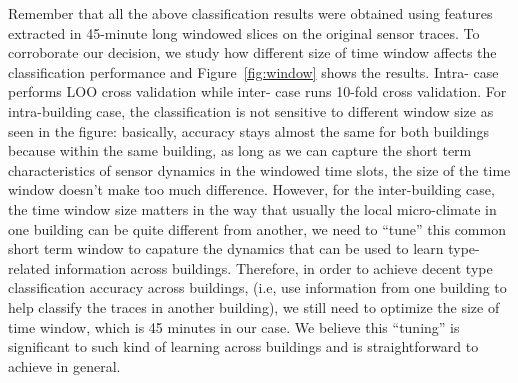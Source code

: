 Remember that all the above classification results were obtained using features extracted in 45-minute long windowed slices on the original sensor traces. To corroborate our decision, 
we study how different size of time window affects the classification performance and Figure~\ref{fig:window} shows the results. Intra- case performs LOO cross validation while inter- 
case runs 10-fold cross validation. For intra-building case, the classification is not sensitive to different window size as seen in the figure: basically, accuracy stays almost the same 
for both buildings because within the same building, as long as we can capture the short term characteristics of sensor dynamics in the windowed time slots, the size of the time window 
doesn't make too much difference. However, for the inter-building case, the time window size matters in the way that usually the local micro-climate in one building can be quite different 
from another, we need to ``tune'' this common short term window to capature the dynamics that can be used to learn type-related information across buildings. Therefore, in order to achieve 
decent type classification accuracy across buildings, (i.e, use information from one building to help classify the traces in another building), we still need to optimize the size of time window, 
which is 45 minutes in our case. We believe this ``tuning'' is significant to such kind of learning across buildings and is straightforward to achieve in general.


